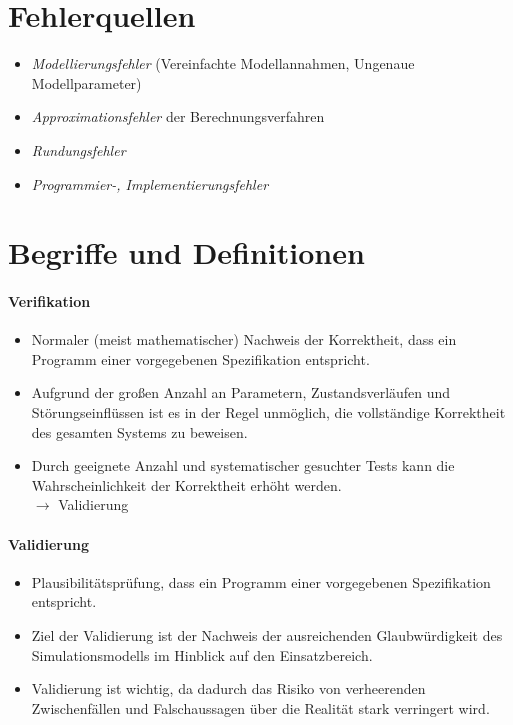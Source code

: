 	\section{Fehlerquellen} %
		\begin{itemize}
			\item \textit{Modellierungsfehler} (Vereinfachte Modellannahmen, Ungenaue Modellparameter)
			\item \textit{Approximationsfehler} der Berechnungsverfahren
			\item \textit{Rundungsfehler}
			\item \textit{Programmier-, Implementierungsfehler}
		\end{itemize}

	\section{Begriffe und Definitionen} %
		\paragraph{Verifikation}
			\begin{itemize}
				\item Normaler (meist mathematischer) Nachweis der Korrektheit, dass ein Programm einer vorgegebenen Spezifikation entspricht.
				\item Aufgrund der großen Anzahl an Parametern, Zustandsverläufen und Störungseinflüssen ist es in der Regel unmöglich, die vollständige Korrektheit des gesamten Systems zu beweisen.
				\item Durch geeignete Anzahl und systematischer gesuchter Tests kann die Wahrscheinlichkeit der Korrektheit erhöht werden. \\ \( \rightarrow \) Validierung
			\end{itemize}

		\paragraph{Validierung}
			\begin{itemize}
				\item Plausibilitätsprüfung, dass ein Programm einer vorgegebenen Spezifikation entspricht.
				\item Ziel der Validierung ist der Nachweis der ausreichenden Glaubwürdigkeit des Simulationsmodells im Hinblick auf den Einsatzbereich.
				\item Validierung ist wichtig, da dadurch das Risiko von verheerenden Zwischenfällen und Falschaussagen über die Realität stark verringert wird.
			\end{itemize}

